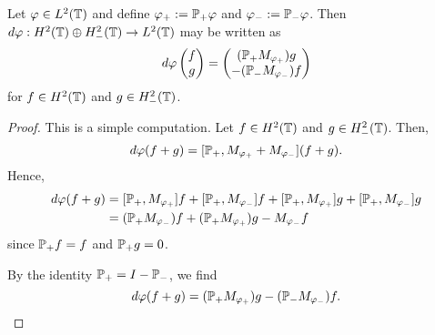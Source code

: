 \documentclass{unswmaths}
\begin{document}
\begin{lemma}
    Let $\varphi \in L^2(\mathbb{T})$ and define $\varphi_+ := \mathbb{P}_+ \varphi$ and $\varphi_- := \mathbb{P}_- \varphi$. Then $d\varphi:H^2(\mathbb{T})\oplus H^2_-(\mathbb{T})\rightarrow L^2(\mathbb{T})$ may be written as
    \begin{equation*}
        d\varphi\begin{pmatrix}
            f\\g
        \end{pmatrix} = \begin{pmatrix}
            (\mathbb{P}_+M_{\varphi_+})g\\
            -(\mathbb{P}_-M_{\varphi_-})f
        \end{pmatrix}
    \end{equation*}
    for $f \in H^2(\mathbb{T})$ and $g \in H^2_-(\mathbb{T})$.
\end{lemma}
\begin{proof}
    This is a simple computation. Let $f \in H^2(\mathbb{T})$ and $g \in H^2_-(\mathbb{T})$. Then,
    \begin{equation*}
        d\varphi(f+g) = [\mathbb{P}_+,M_{\varphi_+}+M_{\varphi_-}](f+g).
    \end{equation*}
    Hence,
    \begin{align*}
        d\varphi(f+g) &= [\mathbb{P}_+,M_{\varphi_+}]f + [\mathbb{P}_+,M_{\varphi_-}]f + [\mathbb{P}_+,M_{\varphi_+}]g + [\mathbb{P}_+,M_{\varphi_-}]g\\
        &= (\mathbb{P}_+M_{\varphi_-})f+(\mathbb{P}_+M_{\varphi_+})g-M_{\varphi_-}f
    \end{align*}
    since $\mathbb{P}_+f = f$ and $\mathbb{P}_+g = 0$.
    
    By the identity $\mathbb{P}_+ = I-\mathbb{P}_-$, we find
    \begin{equation*}
        d\varphi(f+g) = (\mathbb{P}_+M_{\varphi_+})g - (\mathbb{P}_-M_{\varphi_-})f.
    \end{equation*}
\end{proof}
\end{document}
